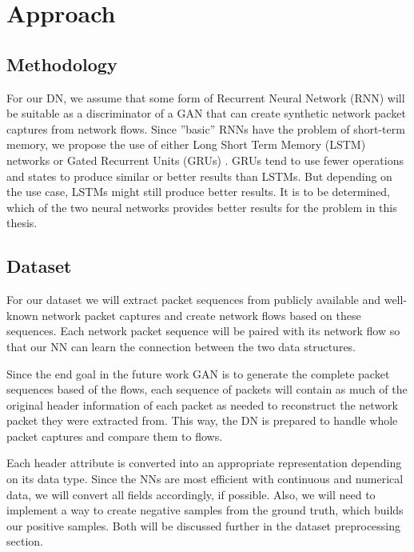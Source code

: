 \documentclass[
	ngerman,
	ruledheaders=section,%
	class=report,%
	thesis={type=bachelor},%
	accentcolor=9c,%
	custommargins=true,%
	marginpar=false,%
	parskip=half-,%
	fontsize=11pt,%
]{tudapub}
\begin{document}
\chapter{Approach}

\section{Methodology}

For our DN, we assume that some form of Recurrent Neural Network (RNN) will be suitable as a discriminator of a GAN that can create synthetic network packet captures from network flows.
Since ''basic'' RNNs have the problem of short-term memory, we propose the use of either Long Short Term Memory (LSTM) networks \cite{hochreiterLongShortTermMemory1997} or Gated Recurrent Units (GRUs) \cite{bahdanauNeuralMachineTranslation2016}.
GRUs tend to use fewer operations and states to produce similar or better results than LSTMs.
But depending on the use case, LSTMs might still produce better results.
It is to be determined, which of the two neural networks provides better results for the problem in this thesis.


\section{Dataset}

For our dataset we will extract packet sequences from publicly available and well-known network packet captures and create network flows based on these sequences.
Each network packet sequence will be paired with its network flow so that our NN can learn the connection between the two data structures.

Since the end goal in the future work GAN is to generate the complete packet sequences based of the flows,
each sequence of packets will contain as much of the original header information of each packet as needed to reconstruct the network packet they were extracted from.
This way, the DN is prepared to handle whole packet captures and compare them to flows.

Each header attribute is converted into an appropriate representation depending on its data type.
Since the NNs are most efficient with continuous and numerical data, we will convert all fields accordingly, if possible.
Also, we will need to implement a way to create negative samples from the ground truth, which builds our positive samples.
Both will be discussed further in the dataset preprocessing section.
\end{document}
